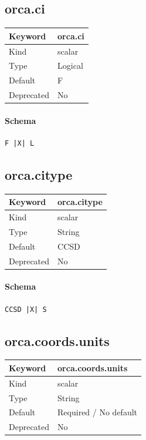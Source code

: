 \documentclass[11pt]{article}
\begin{document}
{{{{{\subsection{orca.ci}
\label{kw:orca-ci}
\begin{longtable}{|p{1.5in}|p{4.5in}|}
\hline
Keyword & orca.ci \\
\hline
Kind & scalar \\
\hline
Type & Logical \\
\hline
Default & F \\
\hline
Deprecated & No \\
\hline
\end{longtable}
\paragraph{Schema}
\begin{Verbatim}
F |X| L
\end{Verbatim}

\subsection{orca.citype}
\label{kw:orca-citype}
\begin{longtable}{|p{1.5in}|p{4.5in}|}
\hline
Keyword & orca.citype \\
\hline
Kind & scalar \\
\hline
Type & String \\
\hline
Default & CCSD \\
\hline
Deprecated & No \\
\hline
\end{longtable}
\paragraph{Schema}
\begin{Verbatim}
CCSD |X| S
\end{Verbatim}

\subsection{orca.coords.units}
\label{kw:orca-coords-units}
\begin{longtable}{|p{1.5in}|p{4.5in}|}
\hline
Keyword & orca.coords.units \\
\hline
Kind & scalar \\
\hline
Type & String \\
\hline
Default & Required / No default \\
\hline
Deprecated & No \\
\hline
\end{longtable}
}}}}}
\end{document}
